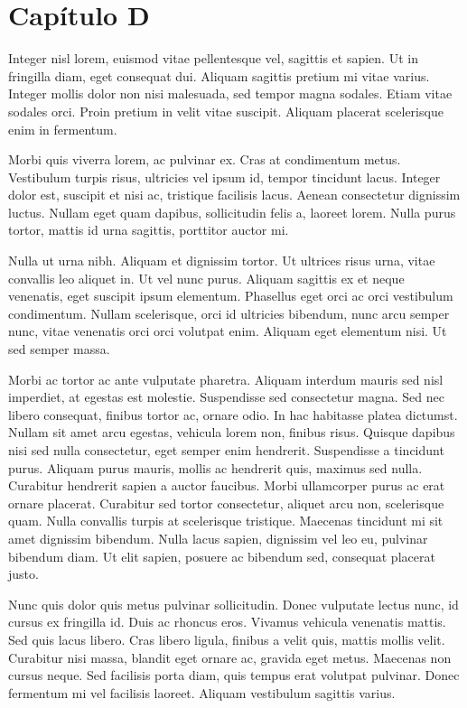 \chapter{Cap\'itulo D}
\label{chap:D}

Integer nisl lorem, euismod vitae pellentesque vel, sagittis et sapien. Ut in fringilla diam, eget consequat dui. Aliquam sagittis pretium mi vitae varius. Integer mollis dolor non nisi malesuada, sed tempor magna sodales. Etiam vitae sodales orci. Proin pretium in velit vitae suscipit. Aliquam placerat scelerisque enim in fermentum.

Morbi quis viverra lorem, ac pulvinar ex. Cras at condimentum metus. Vestibulum turpis risus, ultricies vel ipsum id, tempor tincidunt lacus. Integer dolor est, suscipit et nisi ac, tristique facilisis lacus. Aenean consectetur dignissim luctus. Nullam eget quam dapibus, sollicitudin felis a, laoreet lorem. Nulla purus tortor, mattis id urna sagittis, porttitor auctor mi.

Nulla ut urna nibh. Aliquam et dignissim tortor. Ut ultrices risus urna, vitae convallis leo aliquet in. Ut vel nunc purus. Aliquam sagittis ex et neque venenatis, eget suscipit ipsum elementum. Phasellus eget orci ac orci vestibulum condimentum. Nullam scelerisque, orci id ultricies bibendum, nunc arcu semper nunc, vitae venenatis orci orci volutpat enim. Aliquam eget elementum nisi. Ut sed semper massa.

Morbi ac tortor ac ante vulputate pharetra. Aliquam interdum mauris sed nisl imperdiet, at egestas est molestie. Suspendisse sed consectetur magna. Sed nec libero consequat, finibus tortor ac, ornare odio. In hac habitasse platea dictumst. Nullam sit amet arcu egestas, vehicula lorem non, finibus risus. Quisque dapibus nisi sed nulla consectetur, eget semper enim hendrerit. Suspendisse a tincidunt purus. Aliquam purus mauris, mollis ac hendrerit quis, maximus sed nulla. Curabitur hendrerit sapien a auctor faucibus. Morbi ullamcorper purus ac erat ornare placerat. Curabitur sed tortor consectetur, aliquet arcu non, scelerisque quam. Nulla convallis turpis at scelerisque tristique. Maecenas tincidunt mi sit amet dignissim bibendum. Nulla lacus sapien, dignissim vel leo eu, pulvinar bibendum diam. Ut elit sapien, posuere ac bibendum sed, consequat placerat justo.

Nunc quis dolor quis metus pulvinar sollicitudin. Donec vulputate lectus nunc, id cursus ex fringilla id. Duis ac rhoncus eros. Vivamus vehicula venenatis mattis. Sed quis lacus libero. Cras libero ligula, finibus a velit quis, mattis mollis velit. Curabitur nisi massa, blandit eget ornare ac, gravida eget metus. Maecenas non cursus neque. Sed facilisis porta diam, quis tempus erat volutpat pulvinar. Donec fermentum mi vel facilisis laoreet. Aliquam vestibulum sagittis varius.

